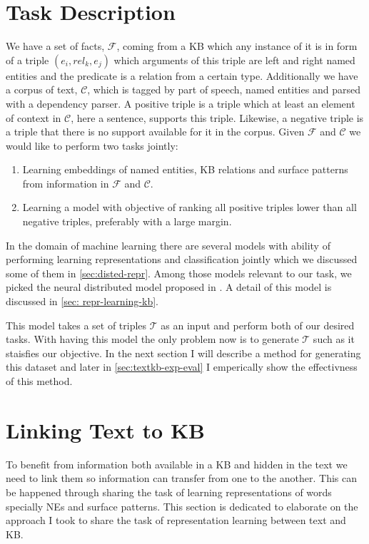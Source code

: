 \section{Task Description}
\label{sec:textkb-task}

We have a set of facts, $\mathcal{F}$, coming from a KB which any instance of it
is in form of a triple $(e_{i}, rel_{k}, e_{j})$ which arguments of this triple are
left and right named entities and the predicate is a relation from a certain
type. Additionally we have a corpus of text, $\mathcal{C}$, which is tagged by
part of speech, named entities and parsed with a dependency parser.
A positive triple is a triple which at least an element of context in
$\mathcal{C}$, here a sentence, supports this triple. Likewise, a negative
triple is a triple that there is no support available for it in the corpus.
Given $\mathcal{F}$ and $\mathcal{C}$ we would like to perform two tasks
jointly:

\begin{enumerate}
  \item Learning embeddings of named entities, KB relations and surface patterns
  from information in $\mathcal{F}$ and $\mathcal{C}$.
  \item Learning a model with objective of ranking all positive triples lower
  than all negative triples, preferably with a large margin.
\end{enumerate}

In the domain of machine learning there are several models with ability of
performing learning representations and classification jointly which we
discussed some of them in \autoref{sec:disted-repr}. Among those models relevant
to our task, we picked the neural distributed model proposed in \cite{Bordes2012}.
A detail of this model is discussed in \autoref{sec: repr-learning-kb}.

This model takes a set of triples $\mathcal{T}$ as an input and perform both of
our desired tasks. With having this model the only problem now is to generate 
$\mathcal{T}$ such as it staisfies our objective. In the next section I will
describe a method for generating this dataset and later in
\autoref{sec:textkb-exp-eval} I emperically show the effectivness of this method.

\section{Linking Text to KB}
\label{sec:textkb-link}

To benefit from information both available in a KB and hidden in the text we
need to link them so information can transfer from one to the another. This can
be happened through sharing the task of learning representations of words
specially NEs and surface patterns. This section is dedicated to elaborate on
the approach I took to share the task of representation learning between text
and KB.

